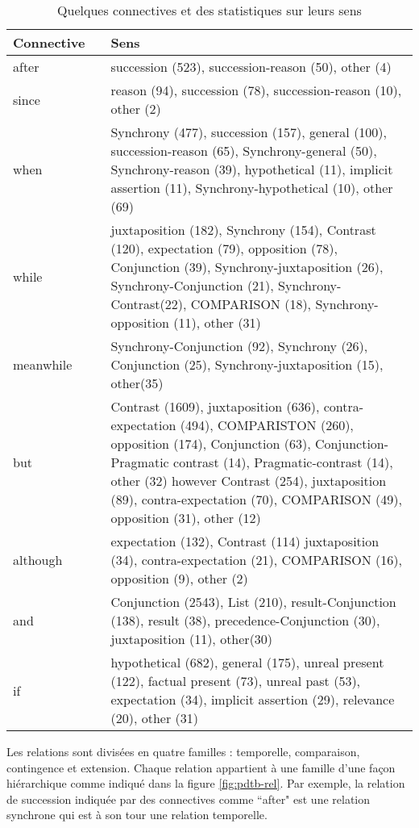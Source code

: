 \documentclass{KodeBook}
\begin{document}
\begin{table}[ht]
	\centering\small
	\begin{tabular}{p{}lp{}}
		\hline\hline
		\textbf{Connective} && \textbf{Sens}\\
		\hline
		
		after && succession (523), succession-reason (50), other (4) \\
		since && reason (94), succession (78), succession-reason (10), other (2) \\
		when && Synchrony (477), succession (157), general (100), succession-reason (65), Synchrony-general (50),
		Synchrony-reason (39), hypothetical (11), implicit assertion (11), Synchrony-hypothetical (10), other
		(69) \\
		while && juxtaposition (182), Synchrony (154), Contrast (120), expectation (79), opposition (78), Conjunction
		(39), Synchrony-juxtaposition (26), Synchrony-Conjunction (21), Synchrony-Contrast(22), COMPARISON (18), Synchrony-opposition (11), other (31) \\
		meanwhile && Synchrony-Conjunction (92), Synchrony (26), Conjunction (25), Synchrony-juxtaposition (15),
		other(35)\\
		but && Contrast (1609), juxtaposition (636), contra-expectation (494), COMPARISTON (260), opposition
		(174), Conjunction (63), Conjunction-Pragmatic contrast (14), Pragmatic-contrast (14), other (32)
		however Contrast (254), juxtaposition (89), contra-expectation (70), COMPARISON (49), opposition (31),
		other (12)\\
		although && expectation (132), Contrast (114) juxtaposition (34), contra-expectation (21), COMPARISON (16),
		opposition (9), other (2)\\
		and && Conjunction (2543), List (210), result-Conjunction (138), result (38), precedence-Conjunction (30),
		juxtaposition (11), other(30)\\
		if && hypothetical (682), general (175), unreal present (122), factual present (73), unreal past (53), expectation (34), implicit assertion (29), relevance (20), other (31)\\
		\hline\hline
	\end{tabular}
	\caption[Quelques connectives et des statistiques sur leurs sens]{Quelques connectives et des statistiques sur leurs sens \cite{2008-prasad-al}}
	\label{tab:pdtb-connect}
\end{table}

Les relations  sont divisées en quatre familles : temporelle, comparaison, contingence et extension. 
Chaque relation appartient à une famille d'une façon hiérarchique comme indiqué dans la figure \ref{fig:pdtb-rel}. 
Par exemple, la relation de succession indiquée par des connectives comme ``after" est une relation synchrone qui est à son tour une relation temporelle.
\end{document}
